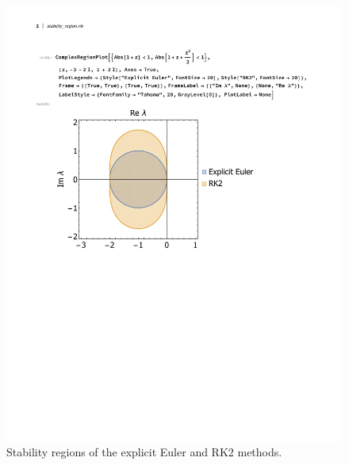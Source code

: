 \begin{figure}[ht]
  \begin{center}
    \includegraphics[scale=0.7]{figures/fig_stability_RK_Euler.pdf}
    \end{center}
  \caption{Stability regions of the explicit Euler and RK2 methods. }
  \label{fig_stability_RK_Euler}
\end{figure}

